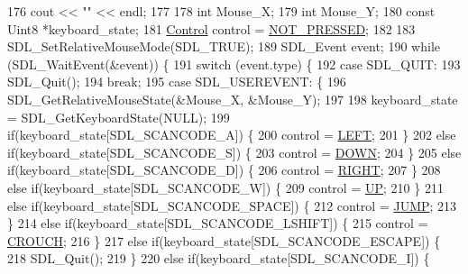 \begin{DoxyCode}
176         cout << \textcolor{stringliteral}{""} << endl;
177 
178         \textcolor{keywordtype}{int} Mouse\_X;
179         \textcolor{keywordtype}{int} Mouse\_Y;
180         \textcolor{keyword}{const} Uint8 *keyboard\_state;
181     \hyperlink{common_8h_a0da83e35f29c11f7f3c637234f2149f9}{Control} control = \hyperlink{common_8h_a0da83e35f29c11f7f3c637234f2149f9acdb8b9a398ffbd729218a27d00d8fa45}{NOT\_PRESSED};
182 
183   SDL\_SetRelativeMouseMode(SDL\_TRUE);
189   SDL\_Event event;
190   \textcolor{keywordflow}{while} (SDL\_WaitEvent(&event)) \{
191     \textcolor{keywordflow}{switch} (event.type) \{
192     \textcolor{keywordflow}{case} SDL\_QUIT:
193       SDL\_Quit();
194       \textcolor{keywordflow}{break};
195     \textcolor{keywordflow}{case} SDL\_USEREVENT: \{
196         SDL\_GetRelativeMouseState(&Mouse\_X, &Mouse\_Y);
197 
198         keyboard\_state = SDL\_GetKeyboardState(NULL);
199         \textcolor{keywordflow}{if}(keyboard\_state[SDL\_SCANCODE\_A]) \{
200             control = \hyperlink{common_8h_a0da83e35f29c11f7f3c637234f2149f9adb45120aafd37a973140edee24708065}{LEFT};
201     \}
202         \textcolor{keywordflow}{else} \textcolor{keywordflow}{if}(keyboard\_state[SDL\_SCANCODE\_S]) \{
203         control = \hyperlink{common_8h_a0da83e35f29c11f7f3c637234f2149f9a9b0b4a95b99523966e0e34ffdadac9da}{DOWN};
204         \}
205         \textcolor{keywordflow}{else} \textcolor{keywordflow}{if}(keyboard\_state[SDL\_SCANCODE\_D]) \{
206             control = \hyperlink{common_8h_a0da83e35f29c11f7f3c637234f2149f9aec8379af7490bb9eaaf579cf17876f38}{RIGHT};
207         \}
208         \textcolor{keywordflow}{else} \textcolor{keywordflow}{if}(keyboard\_state[SDL\_SCANCODE\_W]) \{
209             control = \hyperlink{common_8h_a0da83e35f29c11f7f3c637234f2149f9aba595d8bca8bc5e67c37c0a9d89becfa}{UP};
210         \}
211         \textcolor{keywordflow}{else} \textcolor{keywordflow}{if}(keyboard\_state[SDL\_SCANCODE\_SPACE]) \{
212                 control = \hyperlink{common_8h_a0da83e35f29c11f7f3c637234f2149f9a1f28d4392b1c1e7da2af2283632d81e1}{JUMP};
213         \} 
214         \textcolor{keywordflow}{else} \textcolor{keywordflow}{if}(keyboard\_state[SDL\_SCANCODE\_LSHIFT]) \{
215                 control = \hyperlink{common_8h_a0da83e35f29c11f7f3c637234f2149f9a3cdd4783c5dbeae45bbcd15570a6b273}{CROUCH};
216         \}        
217         \textcolor{keywordflow}{else} \textcolor{keywordflow}{if}(keyboard\_state[SDL\_SCANCODE\_ESCAPE]) \{
218             SDL\_Quit();
219         \}
220         \textcolor{keywordflow}{else} \textcolor{keywordflow}{if}(keyboard\_state[SDL\_SCANCODE\_I]) \{

\end{DoxyCode}
